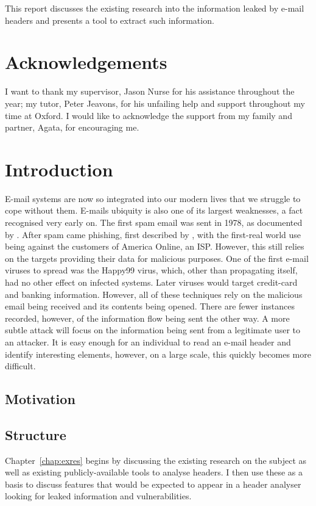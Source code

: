 \documentclass[twoside,10pt]{scrreprt}
\begin{document}
This report discusses the existing research into the information leaked by e-mail headers and presents a tool to extract such information.

\chapter*{Acknowledgements}
I want to thank my supervisor, Jason Nurse for his assistance throughout the year; my tutor, Peter Jeavons, for his unfailing help and support throughout my time at Oxford.  I would like to acknowledge the support from my family and partner, Agata, for encouraging me.

\tableofcontents
\listoftables
\listoffigures
\chapter{Introduction}
E-mail systems are now so integrated into our modern lives that we struggle to cope without them.  E-mails ubiquity is also one of its largest weaknesses, a fact recognised very early on.  The first spam email was sent in 1978, as documented by \cite{templeton}.  After spam came phishing, first described by \cite{felix1987system}, with the first-real world use being against the customers of America Online, an ISP.  However, this still relies on the targets providing their data for malicious purposes.  One of the first e-mail viruses to spread was the Happy99 virus, which, other than propagating itself, had no other effect on infected systems.  Later viruses would target credit-card and banking information.  However, all of these techniques rely on the malicious email being received and its contents being opened.  There are fewer instances recorded, however, of the information flow being sent the other way.  A more subtle attack will focus on the information being sent from a legitimate user to an attacker.  It is easy enough for an individual to read an e-mail header and identify interesting elements, however, on a large scale, this quickly becomes more difficult.

\section{Motivation}

\section{Structure}
Chapter~\ref{chap:exres} begins by discussing the existing research on the subject as well as existing publicly-available tools to analyse headers.  I then use these as a basis to discuss features that would be expected to appear in a header analyser looking for leaked information and vulnerabilities.
\end{document}
